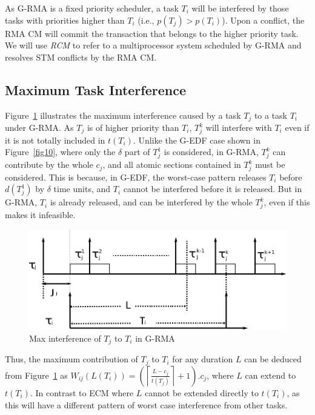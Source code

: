 \documentclass[a4paper,english]{article}
\begin{document}
As G-RMA is a fixed priority scheduler,  a task $T_{i}$ will be interfered by those tasks with priorities higher than $T_{i}$ (i.e., $p(T_{j}) > p(T_{i})$).  Upon a conflict, the RMA CM will commit the transaction that belongs to the higher priority task. We will use \emph{RCM} to refer to a multiprocessor system scheduled by G-RMA and resolves STM conflicts by the RMA CM.


\subsection{Maximum Task Interference}


Figure~\ref{fig11} illustrates the maximum interference caused by a task $T_{j}$
to a task $T_{i}$ under G-RMA. As $T_{j}$ is of higher priority than $T_{i}$,
$T_{j}^{k}$ will interfere with $T_{i}$ even if it is not totally
included in $t(T_{i})$. Unlike the G-EDF case shown in Figure~\ref{fig10}, 
where only the $\delta$ part of $T_{j}^{1}$ is considered, in G-RMA,
$T_{j}^{k}$ can contribute by the whole $c_{j}$, and all atomic
sections contained in $T_{j}^{k}$ must be considered. This is because, in G-EDF, the worst-case pattern releases $T_{i}$ before $d(T_{j}^{1})$
by $\delta$ time units, and $T_{i}$ cannot be interfered before it
is released. But in G-RMA, $T_{i}$ is already released, and can be
interfered by the whole $T_{j}^{k}$, even if this makes it infeasible.


\begin{figure}[htbp]
\centering
\includegraphics[scale=0.5]{figures/figure11}\caption{\label{fig11}Max interference of $T_{j}$ to $T_{i}$ in G-RMA}
\end{figure}

Thus, the maximum contribution of $T_{j}$ to $T_{i}$ for any duration
$L$ can be deduced from Figure~\ref{fig11} as $W_{ij}(L(T_{i}))=\left(\left\lceil\frac{L-c_{j}}{t(T_{j})}\right\rceil+1 \right).c_{j}$,
where $L$ can extend to $t(T_{i})$. In contrast to ECM where $L$ cannot be extended directly to $t(T_i)$, as this will have a different pattern of worst case interference from other tasks.
\end{document}
